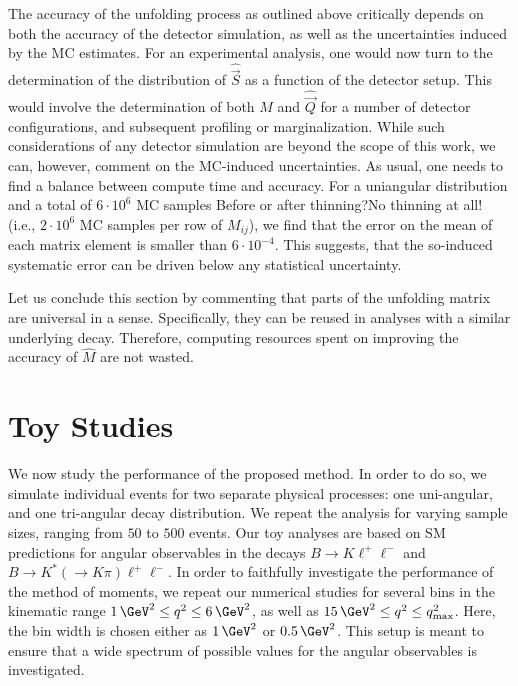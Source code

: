 \documentclass[aps,nofootinbib,preprintnumbers,prd,twocolumn]{revtex4-1}
\newcommand{\est}[1]{\widehat{#1}}
\newcommand{\vecest}[1]{\widehat{\vec{#1}}}
\newcommand{\danny}[1]{{\color{purple}#1}}
\newcommand{\fred}[1]{{\color{brown!85!black}#1}}
\newcommand{\add}[1]{\textcolor{green!85!black}{#1}}
\begin{document}
The accuracy of the unfolding process as outlined above critically depends on both the accuracy
of the detector simulation, as well as the uncertainties induced by the MC estimates.
For an experimental analysis, one would now turn to the determination of the distribution of $\vecest{S}$
as a function of the detector setup. This would involve the determination of both $M$ and $\vecest{Q}$ for a number of
detector configurations, and subsequent profiling or marginalization.
While such considerations of any detector simulation are beyond the scope of this work, we can, however,
comment on the MC-induced uncertainties. As usual, one needs to find a balance between
compute time and accuracy. For a uniangular distribution and a total of $6\cdot 10^6$ MC
samples \fred{Before or after thinning?}\danny{No thinning at all!} (i.e., $2 \cdot 10^6$ MC samples per row of $M_{ij}$), we find that the error on the mean
of each matrix element is smaller than $6\cdot 10^{-4}$. \add{This suggests, that the so-induced
systematic error can be driven below any statistical uncertainty.}

Let us conclude this section by commenting that parts of the unfolding
matrix are universal in a sense. Specifically, they can be reused in analyses with a similar underlying decay.
Therefore, computing resources spent on improving \add{the accuracy of $\est{M}$} are not wasted.


\section{Toy Studies}
\label{sec:numerics}

We now study the performance of the proposed method. In order to do so, we simulate
individual events for two separate physical processes: one uni-angular, and one tri-angular decay
distribution. We repeat the analysis for varying sample sizes, ranging from
$50$ to $500$ events. Our toy analyses are based on SM predictions for angular observables
in the decays $B\to K\ell^+\ell^-$ and $B\to K^*(\to K\pi)\ell^+\ell^-$.
In order to faithfully investigate the performance of the method of moments, we repeat our
numerical studies for several bins in the kinematic range $1\,\GeV^2 \leq q^2 \leq 6\,\GeV^2$,
as well as $15\,\GeV^2 \leq q^2 \leq q^2_\text{max}$. Here, the bin width is chosen either
as $1\,\GeV^2$ or $0.5\,\GeV^2$. This setup is meant to ensure that a wide spectrum of possible
values for the angular observables is investigated.\\
\end{document}

